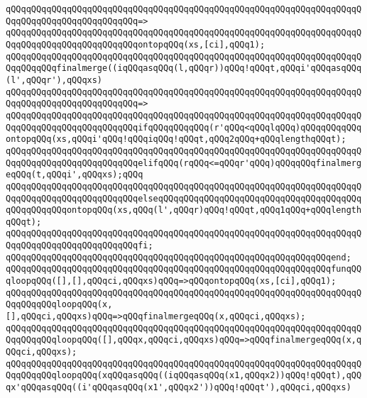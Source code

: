 \verb|qQQqqQQqqQQqqQQqqQQqqQQqqQQqqQQqqQQqqQQqqQQqqQQqqQQqqQQqqQQqqQQqqQQqqQQqqQQqqQQqqQQqqQQqqQQqqQQq=>|\newline
\verb|qQQqqQQqqQQqqQQqqQQqqQQqqQQqqQQqqQQqqQQqqQQqqQQqqQQqqQQqqQQqqQQqqQQqqQQqqQQqqQQqqQQqqQQqqQQqqQQqontopqQQq(xs,[ci],qQQq1);|\newline
\newline
\verb|qQQqqQQqqQQqqQQqqQQqqQQqqQQqqQQqqQQqqQQqqQQqqQQqqQQqqQQqqQQqqQQqqQQqqQQqqQQqqQQqfinalmerge((iqQQqasqQQq(l,qQQqr))qQQq!qQQqt,qQQqi'qQQqasqQQq(l',qQQqr'),qQQqxs)|\newline
\verb|qQQqqQQqqQQqqQQqqQQqqQQqqQQqqQQqqQQqqQQqqQQqqQQqqQQqqQQqqQQqqQQqqQQqqQQqqQQqqQQqqQQqqQQqqQQqqQQq=>|\newline
\verb|qQQqqQQqqQQqqQQqqQQqqQQqqQQqqQQqqQQqqQQqqQQqqQQqqQQqqQQqqQQqqQQqqQQqqQQqqQQqqQQqqQQqqQQqqQQqqQQqifqQQqqQQqqQQq(r'qQQq<qQQqlqQQq)qQQqqQQqqQQqontopqQQq(xs,qQQqi'qQQq!qQQqiqQQq!qQQqt,qQQq2qQQq+qQQqlengthqQQqt);|\newline
\verb|qQQqqQQqqQQqqQQqqQQqqQQqqQQqqQQqqQQqqQQqqQQqqQQqqQQqqQQqqQQqqQQqqQQqqQQqqQQqqQQqqQQqqQQqqQQqqQQqelifqQQq(rqQQq<=qQQqr'qQQq)qQQqqQQqfinalmergeqQQq(t,qQQqi',qQQqxs);qQQq|\newline
\verb|qQQqqQQqqQQqqQQqqQQqqQQqqQQqqQQqqQQqqQQqqQQqqQQqqQQqqQQqqQQqqQQqqQQqqQQqqQQqqQQqqQQqqQQqqQQqqQQqelseqQQqqQQqqQQqqQQqqQQqqQQqqQQqqQQqqQQqqQQqqQQqqQQqqQQqontopqQQq(xs,qQQq(l',qQQqr)qQQq!qQQqt,qQQq1qQQq+qQQqlengthqQQqt);|\newline
\verb|qQQqqQQqqQQqqQQqqQQqqQQqqQQqqQQqqQQqqQQqqQQqqQQqqQQqqQQqqQQqqQQqqQQqqQQqqQQqqQQqqQQqqQQqqQQqqQQqfi;|\newline
\verb|qQQqqQQqqQQqqQQqqQQqqQQqqQQqqQQqqQQqqQQqqQQqqQQqqQQqqQQqqQQqqQQqend;|\newline
\newline
\verb|qQQqqQQqqQQqqQQqqQQqqQQqqQQqqQQqqQQqqQQqqQQqqQQqqQQqqQQqqQQqqQQqfunqQQqloopqQQq([],[],qQQqci,qQQqxs)qQQq=>qQQqontopqQQq(xs,[ci],qQQq1);|\newline
\verb|qQQqqQQqqQQqqQQqqQQqqQQqqQQqqQQqqQQqqQQqqQQqqQQqqQQqqQQqqQQqqQQqqQQqqQQqqQQqqQQqloopqQQq(x,[],qQQqci,qQQqxs)qQQq=>qQQqfinalmergeqQQq(x,qQQqci,qQQqxs);|\newline
\verb|qQQqqQQqqQQqqQQqqQQqqQQqqQQqqQQqqQQqqQQqqQQqqQQqqQQqqQQqqQQqqQQqqQQqqQQqqQQqqQQqloopqQQq([],qQQqx,qQQqci,qQQqxs)qQQq=>qQQqfinalmergeqQQq(x,qQQqci,qQQqxs);|\newline
\verb|qQQqqQQqqQQqqQQqqQQqqQQqqQQqqQQqqQQqqQQqqQQqqQQqqQQqqQQqqQQqqQQqqQQqqQQqqQQqqQQqloopqQQq(xqQQqasqQQq((iqQQqasqQQq(x1,qQQqx2))qQQq!qQQqt),qQQqx'qQQqasqQQq((i'qQQqasqQQq(x1',qQQqx2'))qQQq!qQQqt'),qQQqci,qQQqxs)|\newline
